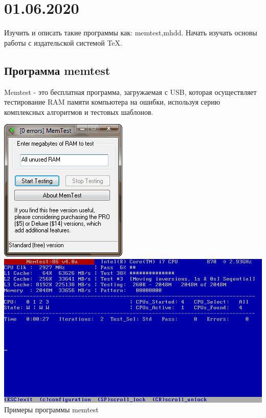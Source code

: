 \documentclass[a4paper,14pt]{extarticle}
\begin{document}
\section{01.06.2020}
Изучить и описать такие программы как: memtest,mhdd. Начать изучать основы работы с издательской системой TeX.
\subsection{Программа memtest}
Memtest\cite{MemTest86} - это бесплатная программа, загружаемая с USB, которая осуществляет тестирование RAM памяти компьютера на ошибки, используя серию комплексных алгоритмов и тестовых шаблонов.\\
\begin{center}
	\includegraphics[scale=0.65]{img/memTest.png}
	\includegraphics[scale=0.8]{img/Memtest86.png}\\ 
	Примеры программы memtest
\end{center}
\end{document}
